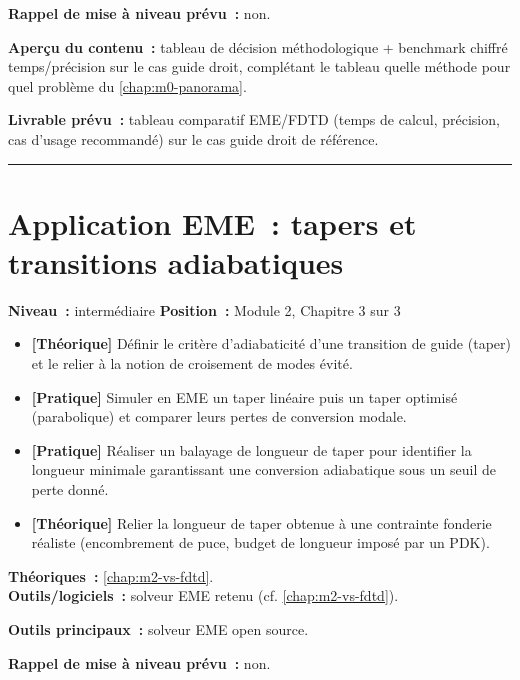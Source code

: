 \noindent\textbf{Rappel de mise à niveau prévu~:} non.

\noindent\textbf{Aperçu du contenu~:} tableau de décision méthodologique + benchmark chiffré temps/précision sur le cas guide droit, complétant le tableau \og quelle méthode pour quel problème\fg{} du \cref{chap:m0-panorama}.

\noindent\textbf{Livrable prévu~:} tableau comparatif EME/FDTD (temps de calcul, précision, cas d'usage recommandé) sur le cas guide droit de référence.

\bigskip\hrule\bigskip

\chapter{Application EME~: tapers et transitions adiabatiques}
\label{chap:m2-application}

\noindent\textbf{Niveau~:} intermédiaire \hfill \textbf{Position~:} Module 2, Chapitre 3 sur 3

\begin{objectifs}
\begin{itemize}[leftmargin=1.4em]
  \item \textbf{[Théorique]} Définir le critère d'adiabaticité d'une transition de guide (taper) et le relier à la notion de croisement de modes évité.
  \item \textbf{[Pratique]} Simuler en EME un taper linéaire puis un taper optimisé (parabolique) et comparer leurs pertes de conversion modale.
  \item \textbf{[Pratique]} Réaliser un balayage de longueur de taper pour identifier la longueur minimale garantissant une conversion adiabatique sous un seuil de perte donné.
  \item \textbf{[Théorique]} Relier la longueur de taper obtenue à une contrainte fonderie réaliste (encombrement de puce, budget de longueur imposé par un PDK).
\end{itemize}
\end{objectifs}

\begin{prerequis}
\textbf{Théoriques~:} \cref{chap:m2-vs-fdtd}.\\
\textbf{Outils/logiciels~:} solveur EME retenu (cf. \cref{chap:m2-vs-fdtd}).
\end{prerequis}

\noindent\textbf{Outils principaux~:} solveur EME open source.

\noindent\textbf{Rappel de mise à niveau prévu~:} non.

